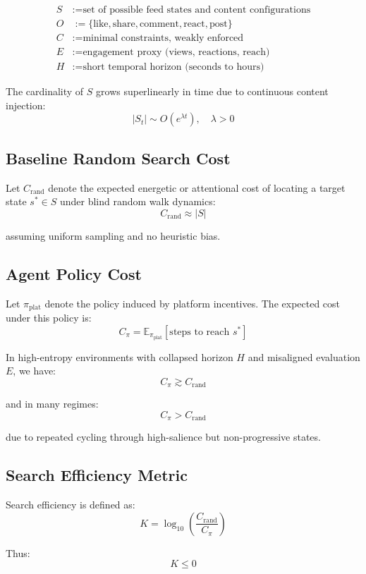\documentclass[12pt]{article}
\begin{document}
\begin{align}
S &:= \text{set of possible feed states and content configurations} \\
O &:= \{\text{like}, \text{share}, \text{comment}, \text{react}, \text{post}\} \\
C &:= \text{minimal constraints, weakly enforced} \\
E &:= \text{engagement proxy (views, reactions, reach)} \\
H &:= \text{short temporal horizon (seconds to hours)}
\end{align}

The cardinality of $S$ grows superlinearly in time due to continuous content injection:
\[
|S_t| \sim O(e^{\lambda t}), \quad \lambda > 0
\]

\subsection{Baseline Random Search Cost}

Let $C_{\text{rand}}$ denote the expected energetic or attentional cost of locating a target state $s^* \in S$ under blind random walk dynamics:
\[
C_{\text{rand}} \approx |S|
\]

assuming uniform sampling and no heuristic bias.

\subsection{Agent Policy Cost}

Let $\pi_{\text{plat}}$ denote the policy induced by platform incentives.
The expected cost under this policy is:
\[
C_{\pi} = \mathbb{E}_{\pi_{\text{plat}}}[\text{steps to reach } s^*]
\]

In high-entropy environments with collapsed horizon $H$ and misaligned evaluation $E$, we have:
\[
C_{\pi} \gtrsim C_{\text{rand}}
\]

and in many regimes:
\[
C_{\pi} > C_{\text{rand}}
\]

due to repeated cycling through high-salience but non-progressive states.

\subsection{Search Efficiency Metric}

Search efficiency is defined as:
\[
K = \log_{10} \left( \frac{C_{\text{rand}}}{C_{\pi}} \right)
\]

Thus:
\[
K \leq 0
\]
\end{document}
